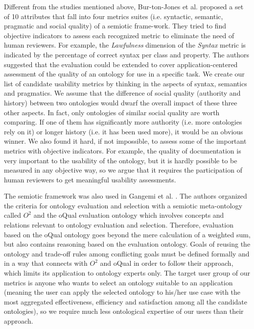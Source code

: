 Different from the studies mentioned above, Bur-ton-Jones et al. \cite{burton2005semiotic} proposed a set of 10 attributes that fall into four metrics suites (i.e. syntactic, semantic, pragmatic and social quality) of a semiotic frame-work. They tried to find objective indicators to assess each recognized metric to eliminate the need of human reviewers. For example, the \emph{Lawfulness} dimension of the \emph{Syntax} metric is indicated by the percentage of correct syntax per class and property. The authors suggested that the evaluation could be extended to cover application-centered assessment of the quality of an ontology for use in a specific task. We create our list of candidate usability metrics by thinking in the aspects of syntax, semantics and pragmatics. We assume that the difference of social quality (authority and history) between two ontologies would dwarf the
overall impact of these three other aspects. In fact, only ontologies of similar social quality are worth comparing. If one of them has significantly more authority (i.e. more ontologies rely on it) or longer history (i.e. it has been used more), it would be an obvious winner. We also found it hard, if not impossible, to assess some of the important metrics with objective indicators. For example, the quality of documentation is very important to the usability of the ontology, but it is hardly possible to be measured in any objective way, so we argue that it requires the participation of human reviewers to get meaningful usability assessments.


The semiotic framework was also used in Gangemi et al. \cite{gangemi2006qood}. The authors organized the criteria for ontology evaluation and selection with a semiotic meta-ontology called $O^2$ and the oQual evaluation ontology which involves concepts and relations relevant to ontology evaluation and selection. Therefore, evaluation based on the oQual ontology goes beyond the mere calculation of a weighted sum, but also contains reasoning based on the evaluation ontology. Goals of reusing the ontology and trade-off rules among conflicting goals must be defined formally and in a way that connects with $O^2$ and oQual in order to follow their approach, which limits its application to ontology experts only. The target user group of our metrics is anyone who wants to select an ontology suitable to an application (meaning the user can apply the selected ontology to his/her use case with the most aggregated effectiveness, efficiency and satisfaction among all the candidate ontologies), so we require much less ontological expertise of our users than their approach.

